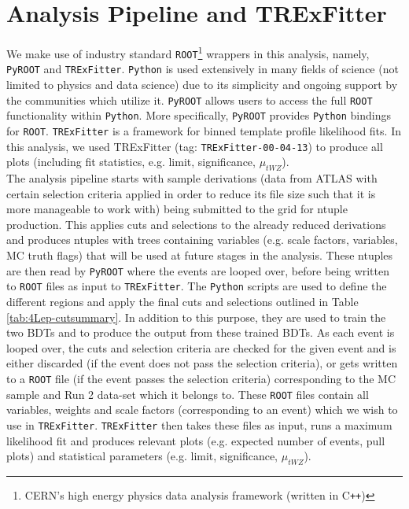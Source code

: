 \section{Analysis Pipeline and TRExFitter}
\label{sec:pipelineAnalysis-and-TRF}
We make use of industry standard \texttt{ROOT}\footnote{CERN's high energy physics data analysis framework (written in C\texttt{++})} wrappers in this analysis, namely, \texttt{PyROOT} and \texttt{TRExFitter}. \texttt{Python} is used extensively in many fields of science (not limited to physics and data science) due to its simplicity and ongoing support by the communities which utilize it. \texttt{PyROOT} allows users to access the full \texttt{ROOT} functionality within \texttt{Python}. More specifically, \texttt{PyROOT} provides \texttt{Python} bindings for \texttt{ROOT}. \texttt{TRExFitter} is a framework for binned template profile likelihood fits\cite{TRexfitter}. In this analysis, we used TRExFitter (tag: \texttt{TRExFitter-00-04-13}) to produce all plots (including fit statistics, e.g. limit, significance, $\mu_{tWZ}$).\\

The analysis pipeline starts with sample derivations (data from ATLAS with certain selection criteria applied in order to reduce its file size such that it is more manageable to work with) being submitted to the grid for ntuple production. This applies cuts and selections to the already reduced derivations and produces ntuples with trees containing variables (e.g. scale factors, variables, MC truth flags) that will be used at future stages in the analysis. These ntuples are then read by \texttt{PyROOT} where the events are looped over, before being written to \texttt{ROOT} files as input to \texttt{TRExFitter}. The \texttt{Python} scripts are used to define the different regions and apply the final cuts and selections outlined in Table \ref{tab:4Lep-cutsummary}. In addition to this purpose, they are used to train the two BDTs and to produce the output from these trained BDTs. As each event is looped over, the cuts and selection criteria are checked for the given event and is either discarded (if the event does not pass the selection criteria), or gets written to a \texttt{ROOT} file (if the event passes the selection criteria) corresponding to the MC sample and Run 2 data-set which it belongs to. These \texttt{ROOT} files contain all variables, weights and scale factors (corresponding to an event) which we wish to use in \texttt{TRExFitter}. \texttt{TRExFitter} then takes these files as input, runs a maximum likelihood fit and produces relevant plots (e.g. expected number of events, pull plots) and statistical parameters (e.g. limit, significance, $\mu_{tWZ}$).


